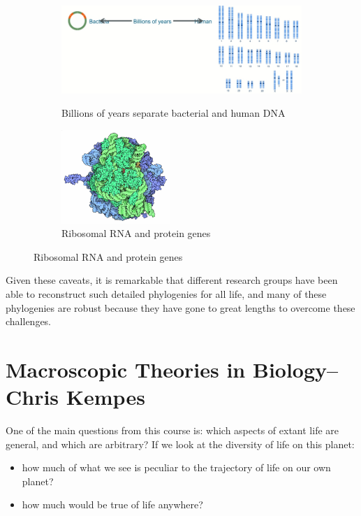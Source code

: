 \documentclass[]{article}
\begin{document}
 \begin{figure}[H]
 	\caption{What genetic information goes back to LUCA? }
 	\begin{subfigure}[t]{0.45\textwidth}
 		\caption{Billions of years separate bacterial and human DNA}
 		\includegraphics[width=\textwidth]{LUCA_what_goes_back}\label{fig:back_to_LUCA}
 	\end{subfigure}
 	\;\;\;
	 \begin{subfigure}[t]{0.45\textwidth}
	 	\caption{Ribosomal RNA and protein genes}\label{fig:Ribosome-5-3-2}
	 	\includegraphics[width=0.45\textwidth]{Ribosome-5-3-2}
	 \end{subfigure}
 \end{figure}

Given these caveats, it is remarkable that different research groups have been able to reconstruct such detailed phylogenies for all life, and many of these phylogenies are robust because they have gone to great lengths to overcome these challenges.


\section[Macroscopic Theories in Biology]{Macroscopic Theories in Biology--Chris Kempes}
 
One of the main questions from this course is: which aspects of extant life are general, and which are arbitrary? If we look at the diversity of life on this planet:
\begin{itemize}
	\item how much of what we see is peculiar to the trajectory of life on our own planet?
	\item how much would be true of life anywhere?
\end{itemize}
\end{document}
